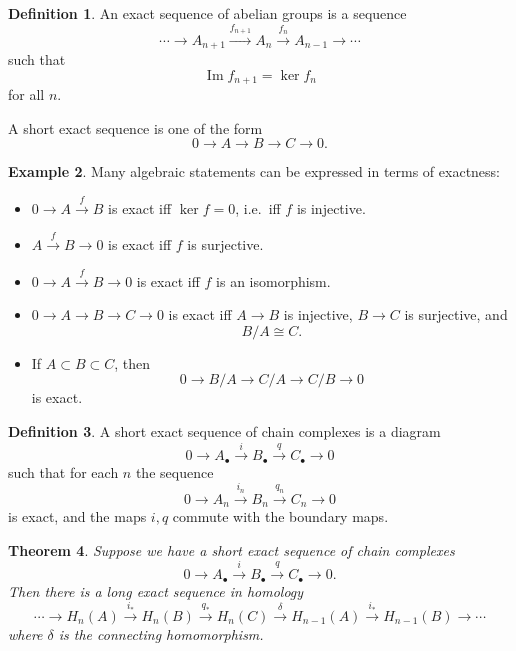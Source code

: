 \documentclass[11pt,a4paper]{article}
\theoremstyle{definition}
\newtheorem{definition}{Definition}[section]
\newtheorem{example}[definition]{Example}
\theoremstyle{plain}
\newtheorem{theorem}[definition]{Theorem}
\theoremstyle{remark}
\newcommand{\1}{\mathbbm{1}}
\begin{document}
\begin{definition}
    An exact sequence of abelian groups is a sequence
    \[
    \cdots \to A_{n+1} \xrightarrow{f_{n+1}} A_n \xrightarrow{f_n} A_{n-1}\to \cdots
    \]
    such that
    \[
    \operatorname{Im} f_{n+1} = \ker f_n
    \]
    for all $n$.

    A short exact sequence is one of the form
    \[
    0 \to A \to B \to C \to 0.
    \]
\end{definition}

\begin{example}
    Many algebraic statements can be expressed in terms of exactness:
    \begin{itemize}
        \item $0\to A\xrightarrow{f}B$ is exact iff $\ker f=0$, i.e.\ iff $f$ is injective.
        \item $A\xrightarrow{f}B\to 0$ is exact iff $f$ is surjective.
        \item $0\to A\xrightarrow{f}B\to 0$ is exact iff $f$ is an isomorphism.
        \item $0\to A\to B\to C\to 0$ is exact iff $A\to B$ is injective, $B\to C$ is surjective, and
        \[
        B/A \cong C.
        \]
        \item If $A\subset B\subset C$, then
        \[
        0\to B/A \to C/A \to C/B \to 0
        \]
        is exact.
    \end{itemize}
\end{example}

\begin{definition}
    A short exact sequence of chain complexes is a diagram
    \[
    0\to A_\bullet \xrightarrow{i} B_\bullet \xrightarrow{q} C_\bullet \to 0
    \]
    such that for each $n$ the sequence
    \[
    0\to A_n \xrightarrow{i_n} B_n \xrightarrow{q_n} C_n \to 0
    \]
    is exact, and the maps $i,q$ commute with the boundary maps.
\end{definition}

\begin{theorem}
    Suppose we have a short exact sequence of chain complexes
    \[
    0\to A_\bullet \xrightarrow{i} B_\bullet \xrightarrow{q} C_\bullet \to 0.
    \]
    Then there is a long exact sequence in homology
    \[
    \cdots \to H_n(A) \xrightarrow{i_*} H_n(B) \xrightarrow{q_*} H_n(C)
    \xrightarrow{\delta} H_{n-1}(A) \xrightarrow{i_*} H_{n-1}(B) \to \cdots
    \]
    where $\delta$ is the connecting homomorphism.
\end{theorem}
\end{document}
